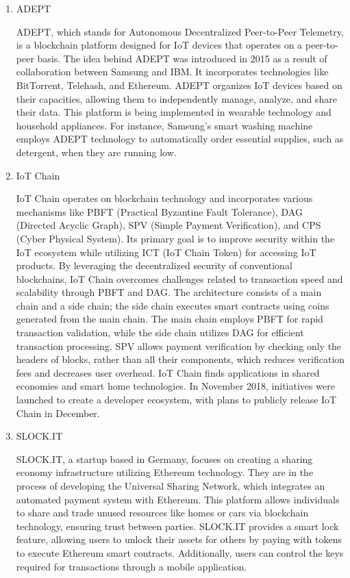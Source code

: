 \documentclass[conference]{IEEEtran}
\begin{document}
\begin{enumerate}[itemsep=2ex, parsep=1ex]
	\item ADEPT
	      	      
	      ADEPT, which stands for Autonomous Decentralized Peer-to-Peer Telemetry,
	      is a blockchain platform designed for IoT devices that operates on a peer-to-peer
	      basis. The idea behind ADEPT was introduced in 2015 as a result of collaboration
	      between Samsung and IBM. It incorporates technologies like BitTorrent, Telehash,
	      and Ethereum. ADEPT organizes IoT devices based on their capacities,
	      allowing them to independently manage, analyze, and share their data. This
	      platform is being implemented in wearable technology and household appliances.
	      For instance, Samsung's smart washing machine employs ADEPT technology to automatically
	      order essential supplies, such as detergent, when they are running low.
	      	      
	\item IoT Chain
	      	      
	      IoT Chain operates on blockchain technology and incorporates various
	      mechanisms like PBFT (Practical Byzantine Fault Tolerance), DAG (Directed
	      Acyclic Graph), SPV (Simple Payment Verification), and CPS (Cyber Physical
	      System). Its primary goal is to improve security within the IoT ecosystem
	      while utilizing ICT (IoT Chain Token) for accessing IoT products. By leveraging
	      the decentralized security of conventional blockchains, IoT Chain
	      overcomes challenges related to transaction speed and scalability through
	      PBFT and DAG. The architecture consists of a main chain and a side chain;
	      the side chain executes smart contracts using coins generated from the
	      main chain. The main chain employs PBFT for rapid transaction validation,
	      while the side chain utilizes DAG for efficient transaction processing. SPV
	      allows payment verification by checking only the headers of blocks, rather
	      than all their components, which reduces verification fees and decreases user
	      overhead. IoT Chain finds applications in shared economies and smart home
	      technologies. In November 2018, initiatives were launched to create a
	      developer ecosystem, with plans to publicly release IoT Chain in December.
	      	      
	\item SLOCK.IT
	      	      
	      SLOCK.IT, a startup based in Germany, focuses on creating a sharing
	      economy infrastructure utilizing Ethereum technology. They are in the process
	      of developing the Universal Sharing Network, which integrates an automated
	      payment system with Ethereum. This platform allows individuals to share and
	      trade unused resources like homes or cars via blockchain technology,
	      ensuring trust between parties. SLOCK.IT provides a smart lock feature,
	      allowing users to unlock their assets for others by paying with tokens to
	      execute Ethereum smart contracts. Additionally, users can control the keys
	      required for transactions through a mobile application.
	      	      

\end{enumerate}
\end{document}
